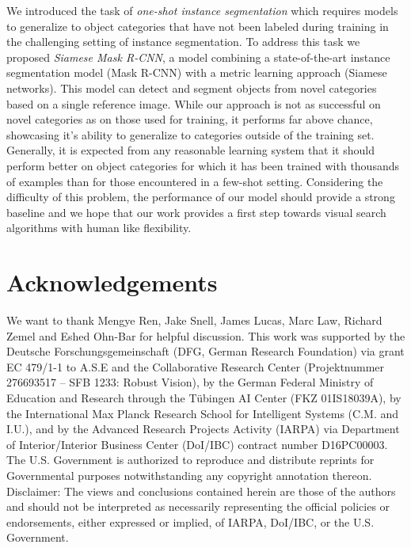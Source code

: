 \documentclass{article}
\begin{document}
We introduced the task of \emph{one-shot instance segmentation} which requires models to generalize to object categories that have not been labeled during training in the challenging setting of instance segmentation. To address this task we proposed \emph{Siamese Mask R-CNN}, a model combining a state-of-the-art instance segmentation model (Mask R-CNN) with a metric learning approach (Siamese networks). This model can detect and segment objects from novel categories based on a single reference image. While our approach is not as successful on novel categories as on those used for training, it performs far above chance, showcasing it's ability to generalize to categories outside of the training set. Generally, it is expected from any reasonable learning system that it should perform better on object categories for which it has been trained with thousands of examples than for those encountered in a few-shot setting. Considering the difficulty of this problem, the performance of our model should provide a strong baseline and we hope that our work provides a first step towards visual search algorithms with human like flexibility. 

\clearpage

\section*{Acknowledgements}

We want to thank Mengye Ren, Jake Snell, James Lucas, Marc Law, Richard Zemel and Eshed Ohn-Bar for helpful discussion. 
This work was supported by the Deutsche Forschungsgemeinschaft (DFG, German Research Foundation) via grant EC 479/1-1 to A.S.E and the Collaborative Research Center (Projektnummer 276693517 -- SFB 1233: Robust Vision), by the German Federal Ministry of Education and Research through the Tübingen AI Center (FKZ 01IS18039A), by the International Max Planck Research School for Intelligent Systems (C.M. and I.U.), and by the Advanced Research Projects Activity (IARPA) via Department of Interior/Interior Business Center (DoI/IBC) contract number D16PC00003. The U.S. Government is authorized to reproduce and distribute reprints for Governmental purposes notwithstanding any copyright annotation thereon. Disclaimer: The views and conclusions contained herein are those of the authors and should not be interpreted as necessarily representing the official policies or endorsements, either expressed or implied, of IARPA, DoI/IBC, or the U.S. Government.
\end{document}
